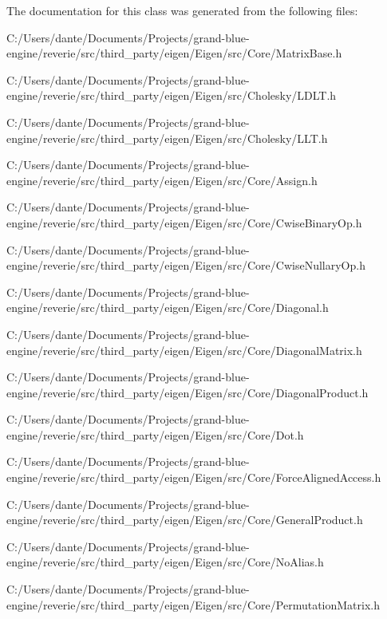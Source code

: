 The documentation for this class was generated from the following files\+:\begin{DoxyCompactItemize}
\item 
C\+:/\+Users/dante/\+Documents/\+Projects/grand-\/blue-\/engine/reverie/src/third\+\_\+party/eigen/\+Eigen/src/\+Core/Matrix\+Base.\+h\item 
C\+:/\+Users/dante/\+Documents/\+Projects/grand-\/blue-\/engine/reverie/src/third\+\_\+party/eigen/\+Eigen/src/\+Cholesky/L\+D\+L\+T.\+h\item 
C\+:/\+Users/dante/\+Documents/\+Projects/grand-\/blue-\/engine/reverie/src/third\+\_\+party/eigen/\+Eigen/src/\+Cholesky/L\+L\+T.\+h\item 
C\+:/\+Users/dante/\+Documents/\+Projects/grand-\/blue-\/engine/reverie/src/third\+\_\+party/eigen/\+Eigen/src/\+Core/Assign.\+h\item 
C\+:/\+Users/dante/\+Documents/\+Projects/grand-\/blue-\/engine/reverie/src/third\+\_\+party/eigen/\+Eigen/src/\+Core/Cwise\+Binary\+Op.\+h\item 
C\+:/\+Users/dante/\+Documents/\+Projects/grand-\/blue-\/engine/reverie/src/third\+\_\+party/eigen/\+Eigen/src/\+Core/Cwise\+Nullary\+Op.\+h\item 
C\+:/\+Users/dante/\+Documents/\+Projects/grand-\/blue-\/engine/reverie/src/third\+\_\+party/eigen/\+Eigen/src/\+Core/Diagonal.\+h\item 
C\+:/\+Users/dante/\+Documents/\+Projects/grand-\/blue-\/engine/reverie/src/third\+\_\+party/eigen/\+Eigen/src/\+Core/Diagonal\+Matrix.\+h\item 
C\+:/\+Users/dante/\+Documents/\+Projects/grand-\/blue-\/engine/reverie/src/third\+\_\+party/eigen/\+Eigen/src/\+Core/Diagonal\+Product.\+h\item 
C\+:/\+Users/dante/\+Documents/\+Projects/grand-\/blue-\/engine/reverie/src/third\+\_\+party/eigen/\+Eigen/src/\+Core/Dot.\+h\item 
C\+:/\+Users/dante/\+Documents/\+Projects/grand-\/blue-\/engine/reverie/src/third\+\_\+party/eigen/\+Eigen/src/\+Core/Force\+Aligned\+Access.\+h\item 
C\+:/\+Users/dante/\+Documents/\+Projects/grand-\/blue-\/engine/reverie/src/third\+\_\+party/eigen/\+Eigen/src/\+Core/General\+Product.\+h\item 
C\+:/\+Users/dante/\+Documents/\+Projects/grand-\/blue-\/engine/reverie/src/third\+\_\+party/eigen/\+Eigen/src/\+Core/No\+Alias.\+h\item 
C\+:/\+Users/dante/\+Documents/\+Projects/grand-\/blue-\/engine/reverie/src/third\+\_\+party/eigen/\+Eigen/src/\+Core/Permutation\+Matrix.\+h\item 

\end{DoxyCompactItemize}
